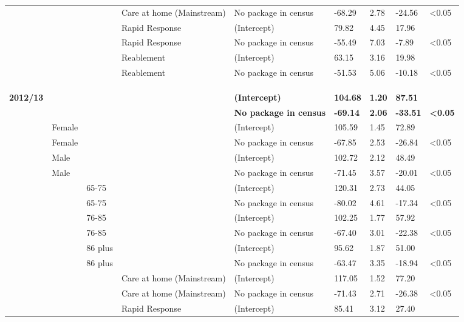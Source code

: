 \documentclass[]{article}
\begin{document}
\begin{landscape}
\begin{longtable}[c]{@{}lllllllll@{}}
 &  &  & Care at home (Mainstream) & No package in census & -68.29 & 2.78 & -24.56 & \textless{}0.05 \\
 &  &  & Rapid Response & (Intercept) & 79.82 & 4.45 & 17.96 &  \\
 &  &  & Rapid Response & No package in census & -55.49 & 7.03 & -7.89 & \textless{}0.05 \\
 &  &  & Reablement & (Intercept) & 63.15 & 3.16 & 19.98 &  \\
 &  &  & Reablement & No package in census & -51.53 & 5.06 & -10.18 & \textless{}0.05 \\
 \\
 \\
 \\
\textbf{2012/13} & \textbf{} & \textbf{} & \textbf{} & \textbf{(Intercept)} & \textbf{104.68} & \textbf{1.20} & \textbf{87.51} & \textbf{} \\
\textbf{} & \textbf{} & \textbf{} & \textbf{} & \textbf{No package in census} & \textbf{-69.14} & \textbf{2.06} & \textbf{-33.51} & \textbf{\textless{}0.05} \\
 & Female &  &  & (Intercept) & 105.59 & 1.45 & 72.89 &  \\
 & Female &  &  & No package in census & -67.85 & 2.53 & -26.84 & \textless{}0.05 \\
 & Male &  &  & (Intercept) & 102.72 & 2.12 & 48.49 &  \\
 & Male &  &  & No package in census & -71.45 & 3.57 & -20.01 & \textless{}0.05 \\
 &  & 65-75 &  & (Intercept) & 120.31 & 2.73 & 44.05 &  \\
 &  & 65-75 &  & No package in census & -80.02 & 4.61 & -17.34 & \textless{}0.05 \\
 &  & 76-85 &  & (Intercept) & 102.25 & 1.77 & 57.92 &  \\
 &  & 76-85 &  & No package in census & -67.40 & 3.01 & -22.38 & \textless{}0.05 \\
 &  & 86 plus &  & (Intercept) & 95.62 & 1.87 & 51.00 &  \\
 &  & 86 plus &  & No package in census & -63.47 & 3.35 & -18.94 & \textless{}0.05 \\
 &  &  & Care at home (Mainstream) & (Intercept) & 117.05 & 1.52 & 77.20 &  \\
 &  &  & Care at home (Mainstream) & No package in census & -71.43 & 2.71 & -26.38 & \textless{}0.05 \\
 &  &  & Rapid Response & (Intercept) & 85.41 & 3.12 & 27.40 &  \\

\end{longtable}
\end{landscape}
\end{document}
